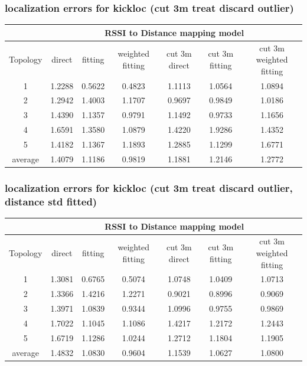 \documentclass[11pt]{beamer}
\begin{document}
\begin{frame}
\frametitle{localization errors for kickloc (cut 3m treat discard outlier)}
\tiny
\begin{tabular}{|c|c|c|c|c|c|c|}
\hline 
 & \multicolumn{6}{c|}{RSSI to Distance mapping model} \\ 
\hline 
Topology & direct  & fitting & weighted fitting & cut 3m direct & cut 3m fitting & cut 3m weighted fitting \\ 
\hline 
1 & 1.2288 & 0.5622 & 0.4823 & 1.1113 & 1.0564 & 1.0894 \\ 
\hline 
2 & 1.2942 & 1.4003 & 1.1707 & 0.9697 & 0.9849 & 1.0186 \\ 
\hline 
3 & 1.4390 & 1.1357 & 0.9791 & 1.1492 & 0.9733 & 1.1656 \\ 
\hline 
4 & 1.6591 & 1.3580 & 1.0879 & 1.4220 & 1.9286 & 1.4352 \\ 
\hline 
5 & 1.4182 & 1.1367 & 1.1893 & 1.2885 & 1.1299 & 1.6771 \\ 
\hline 
average & 1.4079 & 1.1186 & 0.9819 & 1.1881 & 1.2146 & 1.2772 \\ 
\hline 
\end{tabular} 
\end{frame}

\begin{frame}
\frametitle{localization errors for kickloc (cut 3m treat discard outlier, distance std fitted)}
\tiny
\begin{tabular}{|c|c|c|c|c|c|c|}
\hline 
 & \multicolumn{6}{c|}{RSSI to Distance mapping model} \\ 
\hline 
Topology & direct  & fitting & weighted fitting & cut 3m direct & cut 3m fitting & cut 3m weighted fitting \\ 
\hline
1 & 1.3081 & 0.6765 & 0.5074 & 1.0748 & 1.0409 & 1.0713 \\
\hline
2 & 1.3366 & 1.4216 & 1.2271 & 0.9021 & 0.8996 & 0.9069 \\
\hline
3 & 1.3971 & 1.0839 & 0.9344 & 1.0996 & 0.9755 & 0.9869 \\
\hline
4 & 1.7022 & 1.1045 & 1.1086 & 1.4217 & 1.2172 & 1.2443 \\
\hline
5 & 1.6719 & 1.1286 & 1.0244 & 1.2712 & 1.1804 & 1.1905 \\
\hline
average & 1.4832 & 1.0830 & 0.9604 & 1.1539 & 1.0627 & 1.0800 \\
\hline 
\end{tabular} 
\end{frame}
\end{document}

